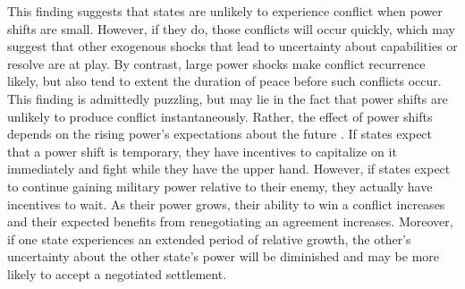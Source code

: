 This finding suggests that states are unlikely to experience conflict when power shifts are small. However, if they do, those conflicts will occur quickly, which may suggest that other exogenous shocks that lead to uncertainty about capabilities or resolve are at play. By contrast, large power shocks make conflict recurrence likely, but also tend to extent the duration of peace before such conflicts occur. This finding is admittedly puzzling, but may lie in the fact that power shifts are unlikely to produce conflict instantaneously. Rather, the effect of power shifts depends on the rising power's expectations about the future \citep{bas2017}. If states expect that a power shift is temporary, they have incentives to capitalize on it immediately and fight while they have the upper hand. However, if states expect to continue gaining military power relative to their enemy, they actually have incentives to wait. As their power grows, their ability to win a conflict increases and their expected benefits from renegotiating an agreement increases. Moreover, if one state experiences an extended period of relative growth, the other's uncertainty about the other state's power will be diminished and may be more likely to accept a negotiated settlement.

\begin{comment}
\begin{table}[ht]
	\centering
	\begin{tabular}{rlrrrr}
		\hline
		& Parameter & Estimate & Std. Error & t value & Pr($>$$|$t$|$) \\ 
		\hline
		1 & Dur\_(Intercept) & 4.00 & 0.24 & 16.84 & 0.00 \\ 
		2 & Dur\_polity2 & 0.21 & 0.03 & 6.78 & 0.00 \\ 
		3 & log(alpha) & -0.03 & 0.12 & -0.27 & 0.79 \\ 
		4 & Risk\_(Intercept) & 6.53 & 3.26 & 2.01 & 0.04 \\ 
		5 & Risk\_polity2 & 0.90 & 0.41 & 2.20 & 0.03 \\ 
		\hline
	\end{tabular}
\end{table}
\end{comment}

